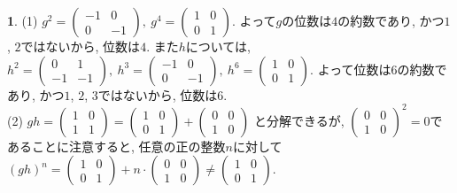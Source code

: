 \documentclass{amsart}
\theoremstyle{definition}
\newtheorem{ans}{}
\numberwithin{ans}{subsection}
\begin{document}
\begin{ans}
  (1) $g^2 = \begin{pmatrix}
    -1 & 0 \\
    0 & -1
  \end{pmatrix},\
  g^4 = \begin{pmatrix}
    1 & 0 \\
    0 & 1
  \end{pmatrix}$.
  よって$g$の位数は$4$の約数であり, かつ$1$, $2$ではないから, 位数は$4$.
  また$h$については,
  $h^2 = \begin{pmatrix}
    0 & 1 \\
    -1 & -1
  \end{pmatrix},\
  h^3 = \begin{pmatrix}
    -1 & 0 \\
    0 & -1
  \end{pmatrix},\
  h^6 = \begin{pmatrix}
    1 & 0 \\
    0 & 1
  \end{pmatrix}$.
  よって位数は$6$の約数であり, かつ$1$, $2$, $3$ではないから, 位数は$6$.\\
  (2) $gh = \begin{pmatrix}
    1 & 0 \\
    1 & 1
  \end{pmatrix} = \begin{pmatrix}
    1 & 0 \\
    0 & 1
  \end{pmatrix} + \begin{pmatrix}
    0 & 0 \\
    1 & 0
  \end{pmatrix}$
  と分解できるが, $\begin{pmatrix}
    0 & 0 \\
    1 & 0
  \end{pmatrix}^2 = 0$であることに注意すると, 任意の正の整数$n$に対して
  $(gh)^n = \begin{pmatrix}
    1 & 0 \\
    0 & 1
  \end{pmatrix} + n \cdot \begin{pmatrix}
    0 & 0 \\
    1 & 0
  \end{pmatrix} \neq \begin{pmatrix}
    1 & 0 \\
    0 & 1
  \end{pmatrix}$.
\end{ans}
\end{document}
